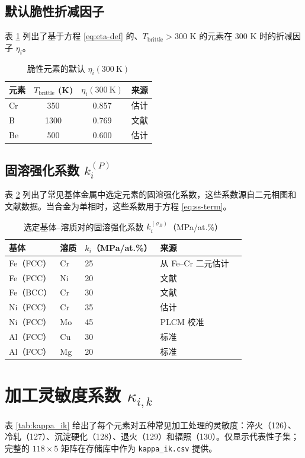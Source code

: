 \documentclass[12pt,a4paper]{article}
\begin{document}
	\subsection{默认脆性折减因子}
	\label{subsec:eta-table}
	表 \ref{tab:eta} 列出了基于方程 \ref{eq:eta-def} 的、$T_{\text{brittle}} > 300$ K 的元素在 300 K 时的折减因子 $\eta_i$。
	\begin{table}[htbp]
		\centering
		\caption{脆性元素的默认 $\eta_i(300\ \mathrm{K})$}
		\label{tab:eta}
		\begin{tabular}{lccc}
			\toprule
			\textbf{元素} & $T_{\text{brittle}}$ (K) & $\eta_i(300\ \mathrm{K})$ & \textbf{来源} \\
			\midrule
			Cr & 350 & 0.857 & 估计 \\
			B  & 1300 & 0.769 & 文献 \\
			Be & 500 & 0.600 & 估计 \\
			\bottomrule
		\end{tabular}
	\end{table}
	
	\subsection{固溶强化系数 $k_i^{(P)}$}
	\label{subsec:kss}
	
	表 \ref{tab:kss} 列出了常见基体金属中选定元素的固溶强化系数，这些系数源自二元相图和文献数据。当合金为单相时，这些系数用于方程 \ref{eq:ss-term}。
	
	\begin{longtable}{p{2cm} p{2cm} p{2cm} p{2cm} p{2cm}}
		\caption{选定基体–溶质对的固溶强化系数 $k_i^{(\sigma_B)}$（MPa/at.\%）}\label{tab:kss}\\
		\toprule
		\textbf{基体} & \textbf{溶质} & $k_i$（MPa/at.\%） & \textbf{来源} \\
		\midrule
		Fe（FCC） & Cr & 25 & 从 Fe–Cr 二元估计 \\
		Fe（FCC） & Ni & 20 & 文献 \\
		Fe（BCC） & Cr & 30 & 文献 \\
		Ni（FCC） & Cr & 35 & 估计 \\
		Ni（FCC） & Mo & 45 & PLCM 校准 \\
		Al（FCC） & Cu & 30 & 标准 \\
		Al（FCC） & Mg & 20 & 标准 \\
		\bottomrule
	\end{longtable}
	
	\section{加工灵敏度系数 $\kappa_{i,k}$}
	表 \ref{tab:kappa_ik} 给出了每个元素对五种常见加工处理的灵敏度：淬火（126）、冷轧（127）、沉淀硬化（128）、退火（129）和辐照（130）。仅显示代表性子集；完整的 $118\times5$ 矩阵在存储库中作为 \texttt{kappa\_ik.csv} 提供。
	
\end{document}
